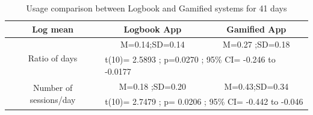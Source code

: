 \newline 
\begin{table}[h!]
  \begin{center}
    \caption{Usage comparison between Logbook and Gamified systems for 41 days}
    \label{table:usagedays}
	\begin{tabular}{|c|c|c|}
		\hline
		Log mean &Logbook App&Gamified App\\
		\hline
		 \multirow{2}{*}{Ratio of days}&M=0.14;SD=0.14&M=0.27 ;SD=0.18\\\cline{2-3} 

		 &\multicolumn{2}{|l|}{t(10)= 2.5893 ; p=0.0270 ; 95\% CI= -0.246 to -0.0177} \\
\hline
   		 \multirow{2}{*}{ Number of sessions/day}&M=0.18 ;SD=0.20&M=0.43;SD=0.34\\\cline{2-3} 
		
		 &\multicolumn{2}{|l|}{t(10)= 2.7479 ; p= 0.0206 ; 95\% CI=  -0.442 to -0.046 } \\
\hline
	\end{tabular}
  \end{center}
\end{table}
\newline 

